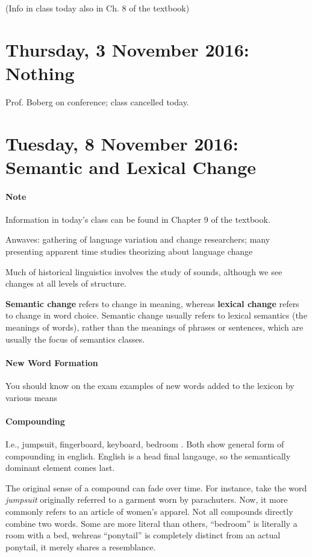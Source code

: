 \documentclass{exam}
\begin{document}
(Info in class today also in Ch. 8 of the textbook)

\section*{Thursday, 3 November 2016: Nothing}

Prof. Boberg on conference; class cancelled today.  

\section*{Tuesday, 8 November 2016: Semantic and Lexical Change}

\paragraph*{Note} Information in today's class can be found in Chapter 9 of the textbook. 

Anwaves: gathering of language variation and change researchers; many presenting apparent time studies \+ theorizing about language change

Much of historical linguistics involves the study of sounds, although we see changes at all levels of structure. 

\textbf{Semantic change} refers to change in meaning, whereas \textbf{lexical change} refers to change in word choice. 
Semantic change usually refers to lexical semantics (the meanings of words), rather than the meanings of phrases or sentences, which are usually the focus of semantics classes. 

\paragraph{New Word Formation} You should know on the exam examples of new words added to the lexicon by various means

\paragraph{Compounding}
I.e., jumpsuit, fingerboard, keyboard, bedroom . Both show general form of compounding in english. English is a head final langauge, so the semantically dominant element comes last. 

The original sense of a compound can fade over time. 
For instance, take the word \textit{jumpsuit} originally referred to a garment worn by parachuters. 
Now, it more commonly refers to an article of women's apparel. 
Not all compounds directly combine two words. 
Some are more literal than others, ``bedroom'' is literally a room with a bed, wehreas 
``ponytail'' is completely distinct from an actual ponytail, it merely shares a resemblance. 
\end{document}
